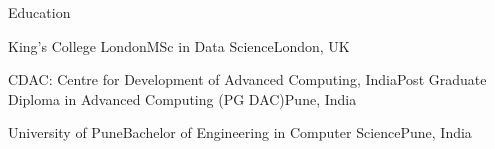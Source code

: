 \documentclass{resume}
\begin{document}
\begin{rSection}{Education}
\begin{rSubsection}{King's College London}{}{MSc in Data Science}{London, UK}
\vspace{-.65cm}
\item[]
\end{rSubsection}
\begin{rSubsection}{CDAC: Centre for Development of Advanced Computing, India}{}{Post Graduate Diploma in Advanced Computing (PG DAC)}{Pune, India}
\vspace{-.65cm}
\item[]
\end{rSubsection}
\begin{rSubsection}{University of Pune}{}{Bachelor of Engineering in Computer Science}{Pune, India}
\vspace{-.65cm}
\item[]
\end{rSubsection}
\end{rSection}
\end{document}
